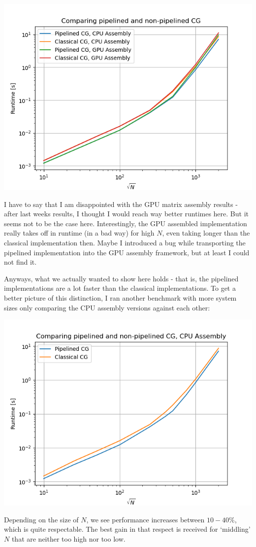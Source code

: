 \documentclass[11pt]{article}
\begin{document}
\includegraphics[scale=0.8]{plots/1comp_quad.png}

I have to say that I am disappointed with the GPU matrix assembly results - after last weeks results, I thought I would reach way better runtimes here. But it seems not to be the case here. Interestingly, the GPU assembled implementation really takes off in runtime (in a bad way) for high \(N\), even taking longer than the classical implementation then. Maybe I introduced a bug while transporting the pipelined implementation into the GPU assembly framework, but at least I could not find it.

Anyways, what we actually wanted to show here holds - that is, the pipelined implementations are a lot faster than the classical implementations. To get a better picture of this distinction, I ran another benchmark with more system sizes only comparing the CPU assembly versions against each other:

\includegraphics[scale=0.8]{plots/1comp_dual.png}

Depending on the size of \(N\), we see performance increases between \(10-40\%\), which is quite respectable. The best gain in that respect is received for `middling' \(N\) that are neither too high nor too low.
\end{document}
